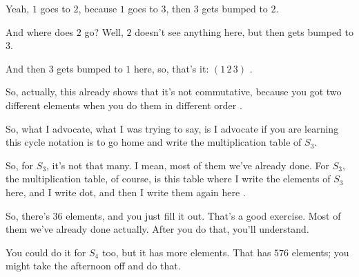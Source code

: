 \begin{speech}[01:15:09 - 01:15:58]
Yeah, $1$ goes to $2$, because $1$ goes to $3$, then $3$ gets bumped to $2$.

And where does $2$ go? Well, $2$ doesn't see anything here, but then gets bumped to $3$.

And then $3$ gets bumped to $1$ here, so, that's it: $(1\,2\,3)$ .

So, actually, this already shows that it's not commutative, because you got two different elements when you do them in different order .

So, what I advocate, what I was trying to say, is I advocate if you are learning this cycle notation is to go home and write the multiplication table of $S_3$.
\end{speech}

\begin{content}
\end{content}

\begin{speech}[01:15:58 - 01:16:58]
So, for $S_3$, it's not that many. I mean, most of them we've already done. For $S_3$, the multiplication table, of course, is this table where I write the elements of $S_3$ here, and I write dot, and then I write them again here .

So, there's $36$ elements, and you just fill it out. That's a good exercise. Most of them we've already done actually. After you do that, you'll understand.

You could do it for $S_4$ too, but it has more elements. That has $576$ elements; you might take the afternoon off and do that.

\end{speech}

